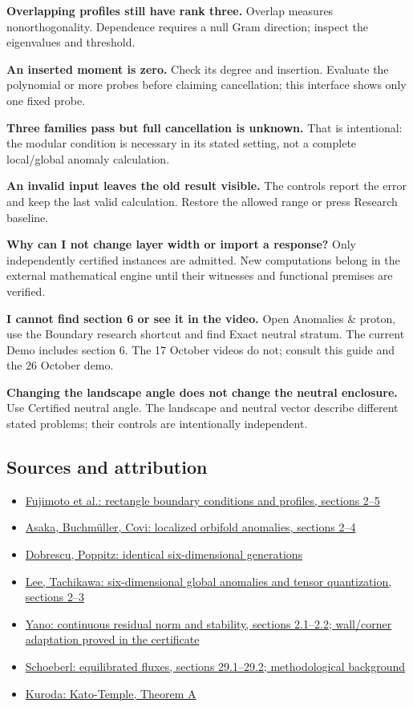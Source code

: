 \documentclass[11pt,a4paper]{article}
\begin{document}
\textbf{Overlapping profiles still have rank three.} Overlap measures nonorthogonality. Dependence requires a null Gram direction; inspect the eigenvalues and threshold.

\textbf{An inserted moment is zero.} Check its degree and insertion. Evaluate the polynomial or more probes before claiming cancellation; this interface shows only one fixed probe.

\textbf{Three families pass but full cancellation is unknown.} That is intentional: the modular condition is necessary in its stated setting, not a complete local/global anomaly calculation.

\textbf{An invalid input leaves the old result visible.} The controls report the error and keep the last valid calculation. Restore the allowed range or press Research baseline.

\textbf{Why can I not change layer width or import a response?} Only independently certified instances are admitted. New computations belong in the external mathematical engine until their witnesses and functional premises are verified.

\textbf{I cannot find section 6 or see it in the video.} Open Anomalies \& proton, use the Boundary research shortcut and find Exact neutral stratum. The current Demo includes section 6. The 17 October videos do not; consult this guide and the 26 October demo.

\textbf{Changing the landscape angle does not change the neutral enclosure.} Use Certified neutral angle. The landscape and neutral vector describe different stated problems; their controls are intentionally independent.

\subsection*{Sources and attribution}
\begin{itemize}
\item \href{https://arxiv.org/abs/1609.01413}{Fujimoto et al.: rectangle boundary conditions and profiles, sections 2--5}
\item \href{https://arxiv.org/abs/hep-ph/0209144}{Asaka, Buchmüller, Covi: localized orbifold anomalies, sections 2--4}
\item \href{https://arxiv.org/abs/hep-ph/0102010}{Dobrescu, Poppitz: identical six-dimensional generations}
\item \href{https://arxiv.org/abs/2012.11622}{Lee, Tachikawa: six-dimensional global anomalies and tensor quantization, sections 2--3}
\item \href{https://arrow.utias.utoronto.ca/~myano/papers/myano_ecrbres.pdf}{Yano: continuous residual norm and stability, sections 2.1--2.2; wall/corner adaptation proved in the certificate}
\item \href{https://jschoeberl.github.io/iFEM/aposteriori/equilibrated.html}{Schoeberl: equilibrated fluxes, sections 29.1--29.2; methodological background}
\item \href{https://ems.press/content/serial-article-files/40994}{Kuroda: Kato-Temple, Theorem A}
\end{itemize}
\end{document}
